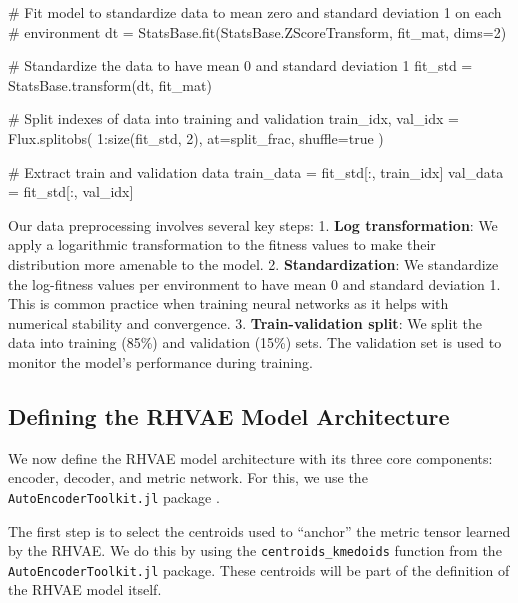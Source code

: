 \documentclass[
]{scrartcl}
\newenvironment{Shaded}{\begin{snugshade}}{\end{snugshade}}
\newcommand{\CommentTok}[1]{\textcolor[rgb]{0.37,0.37,0.37}{#1}}
\newcommand{\ConstantTok}[1]{\textcolor[rgb]{0.56,0.35,0.01}{#1}}
\newcommand{\FloatTok}[1]{\textcolor[rgb]{0.68,0.00,0.00}{#1}}
\newcommand{\FunctionTok}[1]{\textcolor[rgb]{0.28,0.35,0.67}{#1}}
\newcommand{\NormalTok}[1]{\textcolor[rgb]{0.00,0.23,0.31}{#1}}
\newcommand{\OperatorTok}[1]{\textcolor[rgb]{0.37,0.37,0.37}{#1}}
\begin{document}
\begin{Shaded}
\begin{Highlighting}[]
\CommentTok{\# Fit model to standardize data to mean zero and standard deviation 1 on each}
\CommentTok{\# environment }
\NormalTok{dt }\OperatorTok{=}\NormalTok{ StatsBase.}\FunctionTok{fit}\NormalTok{(StatsBase.ZScoreTransform, fit\_mat, dims}\OperatorTok{=}\FloatTok{2}\NormalTok{)}

\CommentTok{\# Standardize the data to have mean 0 and standard deviation 1}
\NormalTok{fit\_std }\OperatorTok{=}\NormalTok{ StatsBase.}\FunctionTok{transform}\NormalTok{(dt, fit\_mat)}

\CommentTok{\# Split indexes of data into training and validation}
\NormalTok{train\_idx, val\_idx }\OperatorTok{=}\NormalTok{ Flux.}\FunctionTok{splitobs}\NormalTok{(}
    \FloatTok{1}\OperatorTok{:}\FunctionTok{size}\NormalTok{(fit\_std, }\FloatTok{2}\NormalTok{), at}\OperatorTok{=}\NormalTok{split\_frac, shuffle}\OperatorTok{=}\ConstantTok{true}
\NormalTok{)}

\CommentTok{\# Extract train and validation data}
\NormalTok{train\_data }\OperatorTok{=}\NormalTok{ fit\_std[}\OperatorTok{:}\NormalTok{, train\_idx]}
\NormalTok{val\_data }\OperatorTok{=}\NormalTok{ fit\_std[}\OperatorTok{:}\NormalTok{, val\_idx]}
\end{Highlighting}
\end{Shaded}

Our data preprocessing involves several key steps: 1. \textbf{Log
transformation}: We apply a logarithmic transformation to the fitness
values to make their distribution more amenable to the model. 2.
\textbf{Standardization}: We standardize the log-fitness values per
environment to have mean 0 and standard deviation 1. This is common
practice when training neural networks as it helps with numerical
stability and convergence. 3. \textbf{Train-validation split}: We split
the data into training (85\%) and validation (15\%) sets. The validation
set is used to monitor the model's performance during training.

\subsection{Defining the RHVAE Model
Architecture}\label{defining-the-rhvae-model-architecture}

We now define the RHVAE model architecture with its three core
components: encoder, decoder, and metric network. For this, we use the
\texttt{AutoEncoderToolkit.jl} package \autocite{razo-mejia2024}.

The first step is to select the centroids used to ``anchor'' the metric
tensor learned by the RHVAE. We do this by using the
\texttt{centroids\_kmedoids} function from the
\texttt{AutoEncoderToolkit.jl} package. These centroids will be part of
the definition of the RHVAE model itself.
\end{document}
